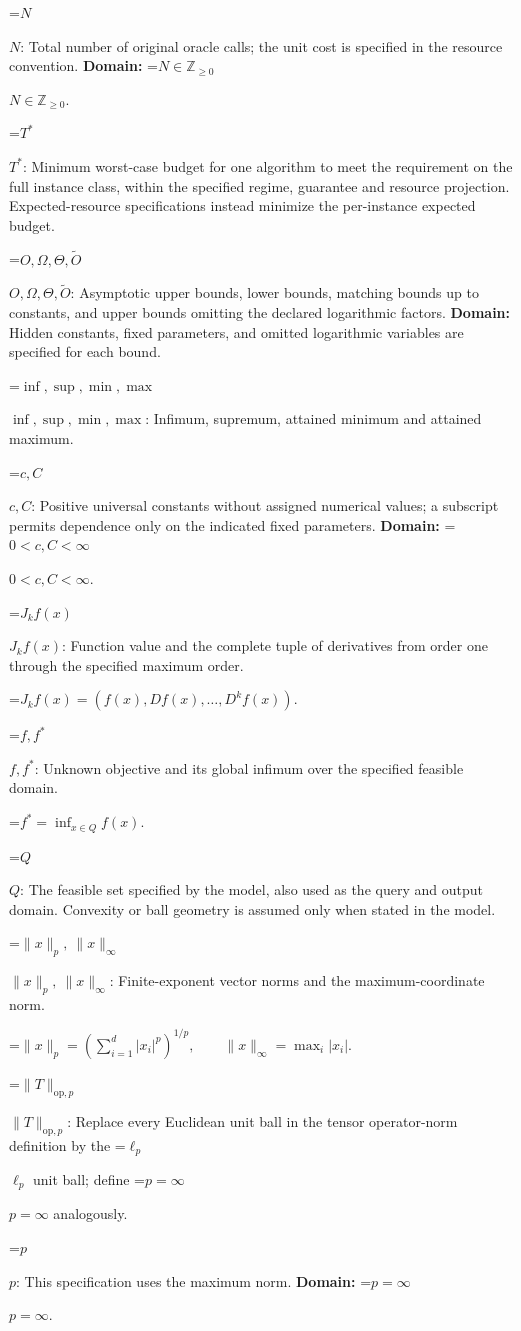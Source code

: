 \documentclass[10pt,a4paper]{article}
\newcommand{\AtlasMath}[1]{\par\begingroup\centering\setbox0=\hbox{$\displaystyle #1$}\ifdim\wd0>1.4\linewidth\typeout{ATLAS WIDE FORMULA: \the\wd0}\fi\ifdim\wd0>\linewidth\resizebox{\linewidth}{!}{\box0}\else\box0\fi\par\endgroup}
\newcommand{\AtlasInlineMath}[1]{\begingroup\setbox0=\hbox{$#1$}\ifdim\wd0>.4\linewidth\endgroup\AtlasMath{#1}\else\endgroup$#1$\fi}
\begin{document}
\AtlasInlineMath{N}: Total number of original oracle calls; the unit cost is specified in the resource convention. \textbf{Domain:} \AtlasInlineMath{N\in\mathbb{Z}_{\ge0}}.

\AtlasInlineMath{T^*}: Minimum worst-case budget for one algorithm to meet the requirement on the full instance class, within the specified regime, guarantee and resource projection. Expected-resource specifications instead minimize the per-instance expected budget.

\AtlasInlineMath{O,\Omega,\Theta,\widetilde{O}}: Asymptotic upper bounds, lower bounds, matching bounds up to constants, and upper bounds omitting the declared logarithmic factors. \textbf{Domain:} Hidden constants, fixed parameters, and omitted logarithmic variables are specified for each bound.

\AtlasInlineMath{\inf,\sup,\min,\max}: Infimum, supremum, attained minimum and attained maximum.

\AtlasInlineMath{c,C}: Positive universal constants without assigned numerical values; a subscript permits dependence only on the indicated fixed parameters. \textbf{Domain:} \AtlasInlineMath{0<c,C<\infty}.

\AtlasInlineMath{J_{k}f(x)}: Function value and the complete tuple of derivatives from order one through the specified maximum order.


\AtlasMath{J_{k}f(x)=(f(x),Df(x),\ldots,D^{k}f(x)).}


\AtlasInlineMath{f,f^*}: Unknown objective and its global infimum over the specified feasible domain.


\AtlasMath{f^*=\inf_{x\in Q}f(x).}


\AtlasInlineMath{Q}: The feasible set specified by the model, also used as the query and output domain. Convexity or ball geometry is assumed only when stated in the model.

\AtlasInlineMath{\|x\|_p,\ \|x\|_\infty}: Finite-exponent vector norms and the maximum-coordinate norm.


\AtlasMath{\|x\|_p=\left(\sum_{i=1}^d|x_i|^p\right)^{1/p},\qquad\|x\|_\infty=\max_i|x_i|.}


\AtlasInlineMath{\|T\|_{\mathrm{op},p}}: Replace every Euclidean unit ball in the tensor operator-norm definition by the \AtlasInlineMath{\ell_p} unit ball; define \AtlasInlineMath{p=\infty} analogously.

\AtlasInlineMath{p}: This specification uses the maximum norm. \textbf{Domain:} \AtlasInlineMath{p=\infty}.
\end{document}
